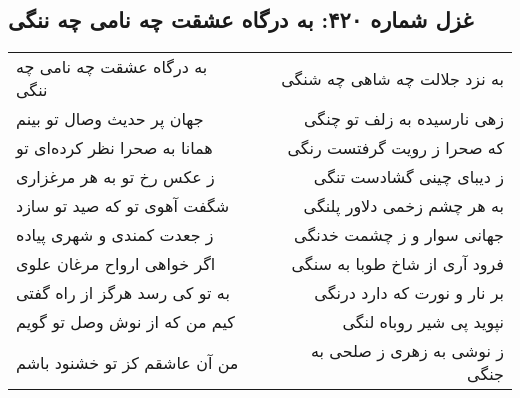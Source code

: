 \begin{center}
\section*{غزل شماره ۴۲۰: به درگاه عشقت چه نامی چه ننگی}
\label{sec:420}
\begin{longtable}{l p{0.5cm} r}
به درگاه عشقت چه نامی چه ننگی
&&
به نزد جلالت چه شاهی چه شنگی
\\
جهان پر حدیث وصال تو بینم
&&
زهی نارسیده به زلف تو چنگی
\\
همانا به صحرا نظر کرده‌ای تو
&&
که صحرا ز رویت گرفتست رنگی
\\
ز عکس رخ تو به هر مرغزاری
&&
ز دیبای چینی گشادست تنگی
\\
شگفت آهوی تو که صید تو سازد
&&
به هر چشم زخمی دلاور پلنگی
\\
ز جعدت کمندی و شهری پیاده
&&
جهانی سوار و ز چشمت خدنگی
\\
اگر خواهی ارواح مرغان علوی
&&
فرود آری از شاخ طوبا به سنگی
\\
به تو کی رسد هرگز از راه گفتی
&&
بر نار و نورت که دارد درنگی
\\
کیم من که از نوش وصل تو گویم
&&
نپوید پی شیر روباه لنگی
\\
من آن عاشقم کز تو خشنود باشم
&&
ز نوشی به زهری ز صلحی به جنگی
\\
\end{longtable}
\end{center}
